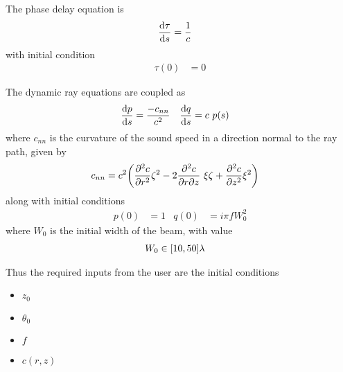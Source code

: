 The phase delay equation is
\begin{align}
	\dv{\tau}{s} &= \frac{1}{c}
\end{align}
with initial condition
\begin{align}
	\tau(0) &= 0
\end{align}

The dynamic ray equations are coupled as
\begin{align}
	\dv{p}{s} &= \frac{-c_{nn}}{c^2} &
	\dv{q}{s} &= c\ p(s)
\end{align}
where $c_{nn}$ is the curvature of the sound speed in a direction normal to the ray path, given by
\begin{align}
	c_{nn} &= c^2 \Par{\pdv[2]{c}{r} \zeta^2 - 2 \pdv[2]{c}{r}{z}\ \xi \zeta + \pdv[2]{c}{z} \xi^2}
\end{align}
along with initial conditions
\begin{align}
	p(0) &= 1 & q(0) &= i\pi f W_0^2
\end{align}
where $W_0$ is the initial width of the beam, with value
\begin{align}
	W_0 &\in { \left[ {10, 50} \right] } \lambda
\end{align}

Thus the required inputs from the user are the initial conditions
\begin{itemize}
	\item $z_0$
	\item $\theta_0$
	\item $f$
	\item $c(r, z)$
\end{itemize}